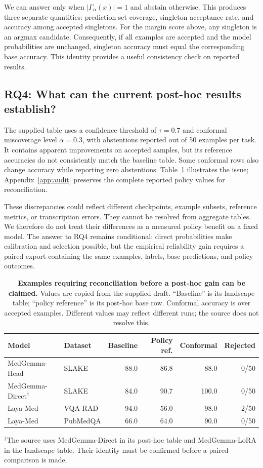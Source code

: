 We can answer only when $|\Gamma_\alpha(x)|=1$ and abstain otherwise. This produces three separate quantities: prediction-set coverage, singleton acceptance rate, and accuracy among accepted singletons. For the margin score above, any singleton is an argmax candidate. Consequently, if all examples are accepted and the model probabilities are unchanged, singleton accuracy must equal the corresponding base accuracy. This identity provides a useful consistency check on reported results.

\subsection{RQ4: What can the current post-hoc results establish?}

The supplied table uses a confidence threshold of $\tau=0.7$ and conformal miscoverage level $\alpha=0.3$, with abstentions reported out of 50 examples per task. It contains apparent improvements on accepted samples, but its reference accuracies do not consistently match the baseline table. Some conformal rows also change accuracy while reporting zero abstentions. Table~\ref{tab:audit} illustrates the issue; Appendix~\ref{app:audit} preserves the complete reported policy values for reconciliation.

These discrepancies could reflect different checkpoints, example subsets, reference metrics, or transcription errors. They cannot be resolved from aggregate tables. We therefore do not treat their differences as a measured policy benefit on a fixed model. The answer to RQ4 remains conditional: direct probabilities make calibration and selection possible, but the empirical reliability gain requires a paired export containing the same examples, labels, base predictions, and policy outcomes.

\begin{table}[t]
\centering\small\renewcommand{\arraystretch}{1.15}
\caption{\textbf{Examples requiring reconciliation before a post-hoc gain can be claimed.} Values are copied from the supplied draft. ``Baseline'' is its landscape table; ``policy reference'' is its post-hoc base row. Conformal accuracy is over accepted examples. Different values may reflect different runs; the source does not resolve this.}
\label{tab:audit}
\begin{tabularx}{\linewidth}{@{}X l r r r r@{}}
\toprule
\textbf{Model} & \textbf{Dataset} & \textbf{Baseline} & \textbf{Policy ref.} & \textbf{Conformal} & \textbf{Rejected}\\
\midrule
MedGemma-Head & SLAKE & 88.0 & 86.8 & 88.0 & 0/50\\
MedGemma-Direct$^\dagger$ & SLAKE & 84.0 & 90.7 & 100.0 & 0/50\\
Laya-Med & VQA-RAD & 94.0 & 56.0 & 98.0 & 2/50\\
Laya-Med & PubMedQA & 66.0 & 64.0 & 90.0 & 0/50\\
\bottomrule
\end{tabularx}
\par\smallskip\footnotesize $^\dagger$The source uses MedGemma-Direct in its post-hoc table and MedGemma-LoRA in the landscape table. Their identity must be confirmed before a paired comparison is made.
\end{table}


